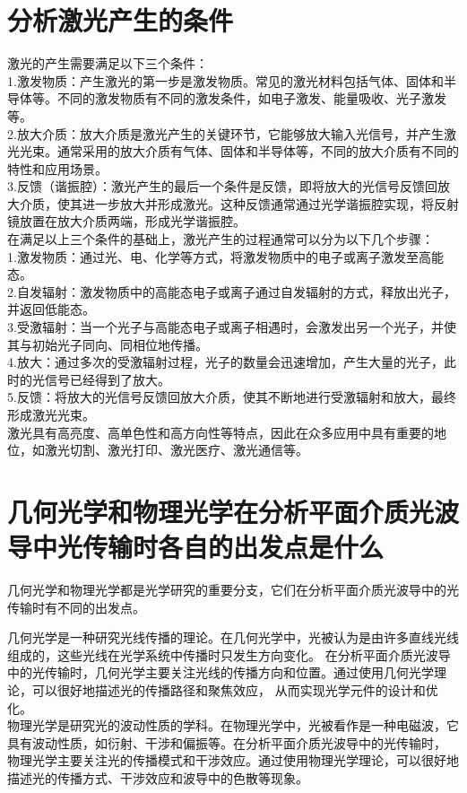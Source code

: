 \documentclass[12pt, a4paper, oneside]{article}
\begin{document}
\begin{spacing}{2.0}
\section{分析激光产生的条件}
激光的产生需要满足以下三个条件：
\\
1.激发物质：产生激光的第一步是激发物质。常见的激光材料包括气体、固体和半导体等。不同的激发物质有不同的激发条件，如电子激发、能量吸收、光子激发等。
\\
2.放大介质：放大介质是激光产生的关键环节，它能够放大输入光信号，并产生激光光束。通常采用的放大介质有气体、固体和半导体等，不同的放大介质有不同的特性和应用场景。
\\
3.反馈（谐振腔）：激光产生的最后一个条件是反馈，即将放大的光信号反馈回放大介质，使其进一步放大并形成激光。这种反馈通常通过光学谐振腔实现，将反射镜放置在放大介质两端，形成光学谐振腔。
\\
在满足以上三个条件的基础上，激光产生的过程通常可以分为以下几个步骤：
\\
1.激发物质：通过光、电、化学等方式，将激发物质中的电子或离子激发至高能态。
\\
2.自发辐射：激发物质中的高能态电子或离子通过自发辐射的方式，释放出光子，并返回低能态。
\\
3.受激辐射：当一个光子与高能态电子或离子相遇时，会激发出另一个光子，并使其与初始光子同向、同相位地传播。
\\
4.放大：通过多次的受激辐射过程，光子的数量会迅速增加，产生大量的光子，此时的光信号已经得到了放大。
\\
5.反馈：将放大的光信号反馈回放大介质，使其不断地进行受激辐射和放大，最终形成激光光束。
\\
激光具有高亮度、高单色性和高方向性等特点，因此在众多应用中具有重要的地位，如激光切割、激光打印、激光医疗、激光通信等。




\section{几何光学和物理光学在分析平面介质光波导中光传输时各自的出发点是什么}
几何光学和物理光学都是光学研究的重要分支，它们在分析平面介质光波导中的光传输时有不同的出发点。

几何光学是一种研究光线传播的理论。在几何光学中，光被认为是由许多直线光线组成的，这些光线在光学系统中传播时只发生方向变化。
在分析平面介质光波导中的光传输时，几何光学主要关注光线的传播方向和位置。通过使用几何光学理论，可以很好地描述光的传播路径和聚焦效应，
从而实现光学元件的设计和优化。
\\
物理光学是研究光的波动性质的学科。在物理光学中，光被看作是一种电磁波，它具有波动性质，如衍射、干涉和偏振等。在分析平面介质光波导中的光传输时，
物理光学主要关注光的传播模式和干涉效应。通过使用物理光学理论，可以很好地描述光的传播方式、干涉效应和波导中的色散等现象。


\end{spacing}
\end{document}
